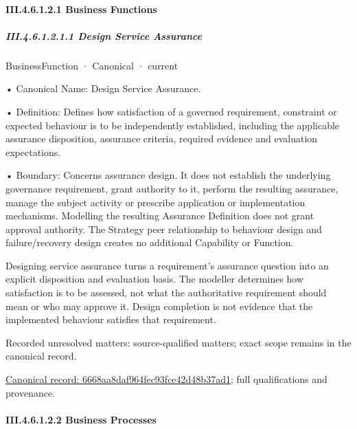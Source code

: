 \paragraph*{III.4.6.1.2.1 Business Functions}
\label{navigation:III.4.6.1.2.1}

\subparagraph*{III.4.6.1.2.1.1 Design Service Assurance}
\label{navigation:III.4.6.1.2.1.1}

\label{element:6668aa8daf964fec93fce42d48b37ad1}
{\small BusinessFunction · Canonical · current}\par

•
Canonical Name: Design Service Assurance.



•
Definition: Defines how satisfaction of a governed requirement, constraint or expected behaviour is to be independently established, including the applicable assurance disposition, assurance criteria, required evidence and evaluation expectations.



•
Boundary: Concerns assurance design. It does not establish the underlying governance requirement, grant authority to it, perform the resulting assurance, manage the subject activity or prescribe application or implementation mechanisms. Modelling the resulting Assurance Definition does not grant approval authority. The Strategy peer relationship to behaviour design and failure/recovery design creates no additional Capability or Function.



Designing service assurance turns a requirement's assurance question into an explicit disposition and evaluation basis. The modeller determines how satisfaction is to be assessed, not what the authoritative requirement should mean or who may approve it. Design completion is not evidence that the implemented behaviour satisfies that requirement.


{\small Recorded unresolved matters: source-qualified matters; exact scope remains in the canonical record.}\par
{\footnotesize \href{../../../../continuum/business/business-function/6668aa8daf964fec93fce42d48b37ad1.md}{Canonical record: 6668aa8daf964fec93fce42d48b37ad1}; full qualifications and provenance.}\par
\paragraph*{III.4.6.1.2.2 Business Processes}
\label{navigation:III.4.6.1.2.2}

